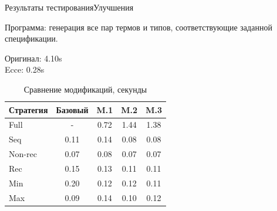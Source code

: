 \documentclass[xcolor=table]{beamer}
\begin{document}
\begin{frame}{Результаты тестирования}{\small Улучшения}

Программа: генерация все пар термов и типов, соответствующие заданной спецификации.

Оригинал: 4.10s \\
Ecce: 0.28s \\

\begin{table}
\center
\begin{tabular}{|l|c|c|c|c|}
\hline
Стратегия & Базовый     & M.1      &  M.2     & M.3      \\ \hline
Full  &   -   & 0.72  & 1.44 & 1.38 \\ \hline
Seq  &  0.11 & 0.14  & 0.08 & 0.08 \\ \hline
Non-rec &  0.07 & 0.08  & 0.07 & 0.07 \\ \hline
Rec  &  0.15 & 0.13  & 0.11 & 0.11 \\ \hline
Min &  0.20 & 0.12  & 0.12 & 0.11 \\ \hline
Max &  0.09 & 0.14  & 0.10 & 0.12 \\ \hline
\end{tabular}
\caption{Сравнение модификаций, секунды}
\end{table}


%


\end{frame}
\end{document}
